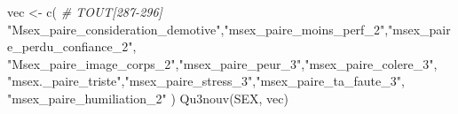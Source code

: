 \documentclass[
]{article}
\newenvironment{Shaded}{\begin{snugshade}}{\end{snugshade}}
\newcommand{\CommentTok}[1]{\textcolor[rgb]{0.56,0.35,0.01}{\textit{#1}}}
\newcommand{\FunctionTok}[1]{\textcolor[rgb]{0.00,0.00,0.00}{#1}}
\newcommand{\NormalTok}[1]{#1}
\newcommand{\OtherTok}[1]{\textcolor[rgb]{0.56,0.35,0.01}{#1}}
\newcommand{\StringTok}[1]{\textcolor[rgb]{0.31,0.60,0.02}{#1}}
\begin{document}
\begin{Shaded}
\begin{Highlighting}[]
\NormalTok{vec }\OtherTok{\textless{}{-}} \FunctionTok{c}\NormalTok{(   }\CommentTok{\# TOUT[287{-}296]}
  \StringTok{"Msex\_paire\_consideration\_demotive"}\NormalTok{,}\StringTok{"msex\_paire\_moins\_perf\_2"}\NormalTok{,}\StringTok{"msex\_paire\_perdu\_confiance\_2"}\NormalTok{,}
  \StringTok{"Msex\_paire\_image\_corps\_2"}\NormalTok{,}\StringTok{"msex\_paire\_peur\_3"}\NormalTok{,}\StringTok{"msex\_paire\_colere\_3"}\NormalTok{,}
  \StringTok{"msex.\_paire\_triste"}\NormalTok{,}\StringTok{"msex\_paire\_stress\_3"}\NormalTok{,}\StringTok{"msex\_paire\_ta\_faute\_3"}\NormalTok{,}
  \StringTok{"msex\_paire\_humiliation\_2"}
\NormalTok{  )}
\FunctionTok{Qu3nouv}\NormalTok{(SEX, vec)}
\end{Highlighting}
\end{Shaded}
\end{document}
